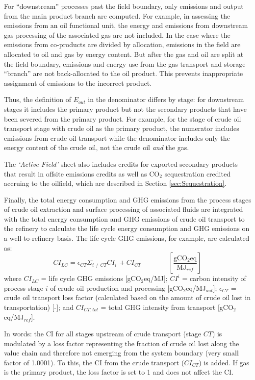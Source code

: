 \documentclass[11pt]{report}
\newcommand{\sheet}[1]{\textit{`{#1}'}}
\newcommand{\eqnunitfrac}[2]{\quad\quad \scriptstyle{\left[\frac{\text{#1}}{\text{#2}}\right]}}
\begin{document}
For ``downstream'' processes past the field boundary, only emissions and output from the main product branch are computed. For example, in assessing the emissions from an oil functional unit, the energy and emissions from downstream gas processing of the associated gas are not included. In the case where the emissions from co-products are divided by allocation, emissions in the field are allocated to oil and gas by energy content. But after the gas and oil are split at the field boundary, emissions and energy use from the gas transport and storage ``branch'' are not back-allocated to the oil product. This prevents inappropriate assignment of emissions to the incorrect product. 

Thus, the definition of $E_{out}$ in the denominator differs by stage: for downstream stages it includes the primary product but not the secondary products that have been severed from the primary product. For example, for the stage of crude oil transport stage with crude oil as the primary product, the numerator includes emissions from crude oil transport while the denominator includes only the energy content of the crude oil, not the crude oil \emph{and} the gas.

The \sheet{Active Field} sheet also includes credits for exported secondary products that result in offsite emissions credits as well as CO$_2$ sequestration credited accruing to the oilfield, which are described in Section \ref{sec:Sequestration}.

Finally, the total energy consumption and GHG emissions from the process stages of crude oil extraction and surface processing of associated fluids are integrated with the total energy consumption and GHG emissions of crude oil transport to the refinery to calculate the life cycle energy consumption and GHG emissions on a well-to-refinery basis. The life cycle GHG emissions, for example, are calculated as:
\begin{equation}
CI_{LC} = \epsilon_{CT} \Sigma_{i\neq CT} CI_{i}\,+CI_{CT} \quad\quad\eqnunitfrac{gCO$_{2}$eq}{MJ$_{ref}$}
\end{equation}
where $CI_{LC}$ = life cycle GHG emissions [gCO$_{2}$eq/MJ]; $CI^{i}$ = carbon intensity of process stage $i$ of crude oil production and processing [gCO$_{2}$eq/MJ$_{out}$]; $\epsilon_{CT}$ = crude oil transport loss factor (calculated based on the amount of crude oil lost in transportation) [-]; and $CI_{CT,tot}$ = total GHG intensity from transport [gCO$_{2}$eq/MJ$_{ref}$]. 

In words: the CI for all stages upstream of crude transport (stage $CT$) is modulated by a loss factor representing the fraction of crude oil lost along the value chain and therefore not emerging from the system boundary (very small factor of 1.0001). To this, the CI from the crude transport ($CI_{CT}$) is added. If gas is the primary product, the loss factor is set to 1 and does not affect the CI.
\end{document}
